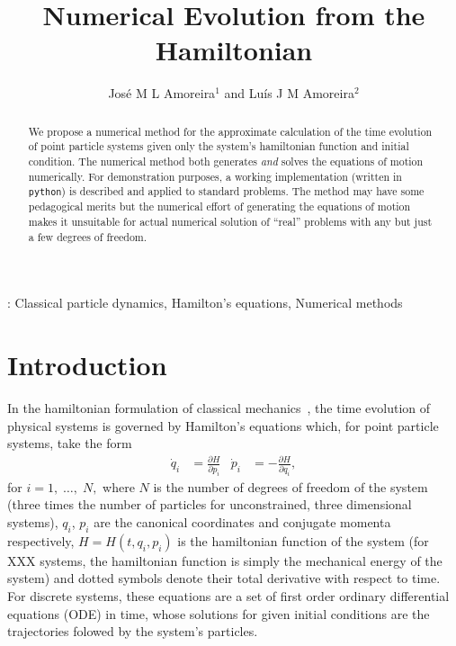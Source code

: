 \documentclass{iopart}
\newcommand{\pd}[2]{\frac{\partial#1}{\partial#2}}
\begin{document}
\title{Numerical Evolution from the Hamiltonian}
\author{José M L Amoreira$^1$ and Luís J M Amoreira$^2$}
\address{$^1$ Departamento de Física, Instituto Superior Técnico, Lisboa,
Portugal}
\address{$^2$ Departamento de Física, Universidade da Beira Interior, Covilhã,
Portugal}
\begin{abstract}
  We propose a numerical method for the approximate calculation of the time
  evolution of point particle systems given only the system's hamiltonian
  function and initial condition. The numerical method both generates \emph{and}
  solves the equations of motion numerically. For demonstration purposes, a
  working im\-ple\-men\-ta\-tion (written in \texttt{python}) is described and
  applied to standard problems. The method may have some pedagogical merits but
  the numerical effort of generating the equations of motion makes it unsuitable
  for actual numerical solution of ``real'' problems with any but just a few
  degrees of freedom.
\end{abstract}
: Classical particle dynamics,
Hamilton's equations,
Numerical methods

\submitto{\EJP}
\section{Introduction}
In the hamiltonian formulation of classical mechanics~\cite{gol:1980}, the time
evolution of physical systems is governed by Hamilton's equations which, for
point particle systems, take the form
\begin{align}\label{eq:heqs}
  \dot q_i&=\pd{H}{p_i}&
  \dot p_i&=-\pd{H}{q_i},
\end{align}
for $i=1,\;\ldots,\;N,$ where $N$ is the number of degrees of freedom of the
system (three times the number of particles for unconstrained, three dimensional
systems), $q_i$, $p_i$ are the canonical coordinates and conjugate momenta
respectively, $H=H(t, q_i, p_i)$ is the hamiltonian function of the system
(for XXX systems, the hamiltonian function is simply the mechanical energy of
the system) and dotted symbols denote their total derivative with respect to
time. For discrete systems, these equations are a set of first order
ordinary differential equations (ODE) in time, whose solutions for given initial
conditions are the trajectories folowed by the system's particles.
\end{document}
